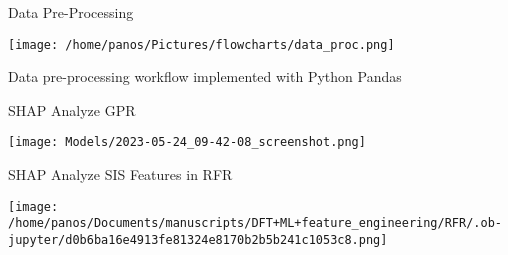 \documentclass[10pt, aspectratio=169, presentation]{beamer}
\begin{document}
\begin{frame}[label={sec:orgfb798ca}]{Data Pre-Processing}
\begin{center}
\texttt{[image: /home/panos/Pictures/flowcharts/data\_proc.png]}
\end{center}
\center{}Data pre-processing workflow implemented with Python Pandas
\end{frame}

\begin{frame}[label={sec:org5369737}]{SHAP Analyze GPR}
\begin{center}
\texttt{[image: Models/2023-05-24\_09-42-08\_screenshot.png]}
\end{center}
\end{frame}

\begin{frame}[label={sec:org59e0f47}]{SHAP Analyze SIS Features in RFR}
\begin{center}
\texttt{[image: /home/panos/Documents/manuscripts/DFT+ML+feature\_engineering/RFR/.ob-jupyter/d0b6ba16e4913fe81324e8170b2b5b241c1053c8.png]}
\end{center}
\end{frame}
\end{document}
